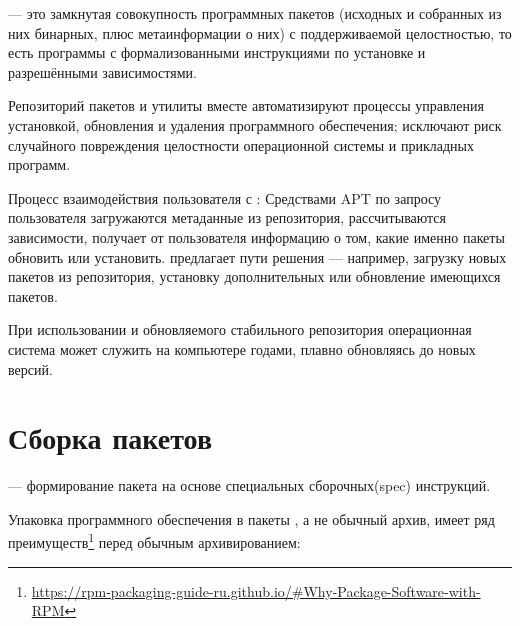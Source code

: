 --- это замкнутая совокупность программных пакетов (исходных и 
собранных из них бинарных, плюс метаинформации о них) с поддерживаемой целостностью, то есть программы с 
формализованными инструкциями по установке и разрешёнными зависимостями.

Репозиторий пакетов и утилиты  вместе автоматизируют процессы управления установкой, обновления и удаления
программного обеспечения; исключают риск случайного повреждения целостности операционной системы и прикладных 
программ.

Процесс взаимодействия пользователя с : Средствами APT по запросу пользователя загружаются метаданные
из репозитория, рассчитываются зависимости,  получает от пользователя информацию о том,
какие именно пакеты обновить или установить.  предлагает пути решения --- например, загрузку
новых пакетов из репозитория, установку дополнительных или обновление имеющихся пакетов.


При использовании  и обновляемого стабильного репозитория операционная система может 
служить на компьютере годами, плавно обновляясь до новых версий.

\hypertarget{1.3}{\section{Сборка пакетов}}
 --- формирование пакета на основе специальных сборочных(spec) инструкций.

 Упаковка программного обеспечения в пакеты , а не обычный архив, имеет ряд
преимуществ\footnote{\href{https://rpm-packaging-guide-ru.github.io/\#Why-Package-Software-with-RPM}
{https://rpm-packaging-guide-ru.github.io/\#Why-Package-Software-with-RPM}} перед обычным архивированием:

